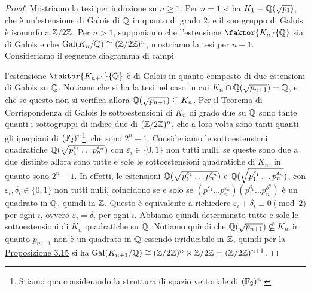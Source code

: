 \documentclass[11pt]{scrartcl}
\begin{document}
	\begin{proof}
		Mostriamo la tesi per induzione su $n \geq 1$. Per $n = 1$ si ha $K_1 = \mathbb Q(\sqrt{p_1})$,
		che è un'estensione di Galois di $\mathbb Q$ in quanto di grado 2, e il suo 
		gruppo di Galois è isomorfo a $\mathbb{Z}/{2}\mathbb{Z}$. Per $n > 1$, supponiamo che l'estensione
		$\faktor{K_n}{\QQ}$ sia di Galois e che $\operatorname{Gal}(K_n/\mathbb Q) \cong (\mathbb{Z}/{2}\mathbb{Z})^n$, 
		mostriamo la tesi per $n + 1$. Consideriamo il seguente diagramma di campi
		\begin{center}
		\end{center}
		l'estensione $\faktor{K_{n + 1}}{\QQ}$ è di Galois in quanto composto
		di due estensioni di Galois su $\mathbb Q$. Notiamo che si ha la tesi nel caso 
		in cui $K_n \cap \mathbb Q(\sqrt{p_{n + 1}}) = \mathbb Q$, e che se questo non si 
		verifica allora $\mathbb Q(\sqrt{p_{n + 1}}) \subseteq K_n$. Per il Teorema di 
		Corrispondenza di Galois le sottoestensioni di $K_n$ di grado due su 
		$\mathbb Q$ sono tante quanti i sottogruppi di indice due di $(\mathbb{Z}/{2}\mathbb{Z})^n$, che a 
		loro volta sono tanti quanti gli iperpiani di $(\mathbb F_2)^n$\footnote{
			Stiamo qua considerando la struttura di spazio vettoriale di $(\mathbb F_2)^n$.
		}, che sono $2^n - 1$.
		Consideriamo le sottoestensioni quadratiche 
		$\mathbb Q(\sqrt{p_1^{\varepsilon_1}\ldots p_n^{\varepsilon_n}})$ con $\varepsilon_i \in \{0, 1\}$
		non tutti nulli, se queste sono due a due distinte allora sono tutte e sole
		le sottoestensioni quadratiche di $K_n$, in quanto sono $2^n - 1$. In effetti,
		le estensioni $\mathbb Q(\sqrt{p_1^{\varepsilon_1}\ldots p_n^{\varepsilon_n}})$ e
		$\mathbb Q(\sqrt{p_1^{\delta_1}\ldots p_n^{\delta_n}})$, con 
		$\varepsilon_i, \delta_i \in \{0, 1\}$ non tutti nulli, coincidono se e solo se 
		$(p_1^{\varepsilon_1}\ldots p_n^{\varepsilon_n})(p_1^{\delta_1}\ldots p_n^{\delta^n})$
		è un quadrato in $\mathbb Q$, quindi in $\mathbb Z$. Questo è equivalente a richiedere
		$\varepsilon_i + \delta_i \equiv 0 \pmod 2$ per ogni $i$, ovvero 
		$\varepsilon_i = \delta_i$ per ogni $i$. Abbiamo quindi determinato tutte 
		e sole le sottoestensioni di $K_n$ quadratiche su $\mathbb Q$. Notiamo quindi 
		che $\mathbb Q(\sqrt{p_{n + 1}}) \nsubseteq K_n$ in quanto $p_{n + 1}$ non è 
		un quadrato in $\mathbb Q$ essendo irriducibile in $\mathbb Z$, quindi per la 
		\hyperref[prop3.15]{Proposizione 3.15} si ha $\operatorname{Gal}(K_{n + 1}/\mathbb Q) \cong
		(\mathbb{Z}/{2}\mathbb{Z})^n\times \mathbb{Z}/{2}\mathbb{Z} = (\mathbb{Z}/{2}\mathbb{Z})^{n + 1}$.
	\end{proof}
	
\end{document}
